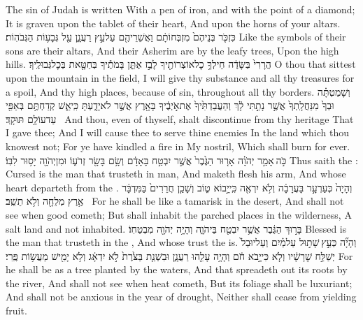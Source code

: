 {The sin of Judah is written With a pen of iron, and with the point of a diamond; It is graven upon the tablet of their heart, And upon the horns of your altars.}
{כִּזְכֹּ֤ר בְּנֵיהֶם֙ מִזְבְּחוֹתָ֔ם וַאֲשֵׁרֵיהֶ֖ם עַל\maqqaf עֵ֣ץ רַעֲנָ֑ן עַ֖ל גְּבָע֥וֹת הַגְּבֹהֽוֹת׃}
{Like the symbols of their sons are their altars, And their Asherim are by the leafy trees, Upon the high hills.}
{הֲרָרִי֙ בַּשָּׂדֶ֔ה חֵילְךָ֥ כׇל\maqqaf אוֹצְרוֹתֶ֖יךָ לָבַ֣ז אֶתֵּ֑ן בָּמֹתֶ֕יךָ בְּחַטָּ֖את בְּכׇל\maqqaf גְּבוּלֶֽיךָ׃}
{O thou that sittest upon the mountain in the field, I will give thy substance and all thy treasures for a spoil, And thy high places, because of sin, throughout all thy borders.}
{וְשָׁמַטְתָּ֗ה וּבְךָ֙ מִנַּחֲלָֽתְךָ֙ אֲשֶׁ֣ר נָתַ֣תִּי לָ֔ךְ וְהַעֲבַדְתִּ֙יךָ֙ אֶת\maqqaf אֹ֣יְבֶ֔יךָ בָּאָ֖רֶץ אֲשֶׁ֣ר לֹא\maqqaf יָדָ֑עְתָּ כִּֽי\maqqaf אֵ֛שׁ קְדַחְתֶּ֥ם בְּאַפִּ֖י עַד\maqqaf עוֹלָ֥ם תּוּקָֽד׃ \setuma }
{And thou, even of thyself, shalt discontinue from thy heritage That I gave thee; And I will cause thee to serve thine enemies In the land which thou knowest not; For ye have kindled a fire in My nostril, Which shall burn for ever.}
{כֹּ֣ה \legarmeh  אָמַ֣ר יְהֹוָ֗ה אָר֤וּר הַגֶּ֙בֶר֙ אֲשֶׁ֣ר יִבְטַ֣ח בָּאָדָ֔ם וְשָׂ֥ם בָּשָׂ֖ר זְרֹע֑וֹ וּמִן\maqqaf יְהֹוָ֖ה יָס֥וּר לִבּֽוֹ׃}
{Thus saith the \lord: Cursed is the man that trusteth in man, And maketh flesh his arm, And whose heart departeth from the \lord.}
{וְהָיָה֙ כְּעַרְעָ֣ר בָּעֲרָבָ֔ה וְלֹ֥א יִרְאֶ֖ה כִּֽי\maqqaf יָ֣בוֹא ט֑וֹב וְשָׁכַ֤ן חֲרֵרִים֙ בַּמִּדְבָּ֔ר אֶ֥רֶץ מְלֵחָ֖ה וְלֹ֥א תֵשֵֽׁב׃ \setuma }
{For he shall be like a tamarisk in the desert, And shall not see when good cometh; But shall inhabit the parched places in the wilderness, A salt land and not inhabited.}
{בָּר֣וּךְ הַגֶּ֔בֶר אֲשֶׁ֥ר יִבְטַ֖ח בַּיהֹוָ֑ה וְהָיָ֥ה יְהֹוָ֖ה מִבְטַחֽוֹ׃}
{Blessed is the man that trusteth in the \lord, And whose trust the \lord\space is.}
{וְהָיָ֞ה כְּעֵ֣ץ \legarmeh  שָׁת֣וּל עַל\maqqaf מַ֗יִם וְעַל\maqqaf יוּבַל֙ יְשַׁלַּ֣ח שׇׁרָשָׁ֔יו וְלֹ֤א  כִּי\maqqaf יָ֣בֹא חֹ֔ם וְהָיָ֥ה עָלֵ֖הוּ רַעֲנָ֑ן וּבִשְׁנַ֤ת בַּצֹּ֙רֶת֙ לֹ֣א יִדְאָ֔ג וְלֹ֥א יָמִ֖ישׁ מֵעֲשׂ֥וֹת פֶּֽרִי׃}
{For he shall be as a tree planted by the waters, And that spreadeth out its roots by the river, And shall not see when heat cometh, But its foliage shall be luxuriant; And shall not be anxious in the year of drought, Neither shall cease from yielding fruit.}
